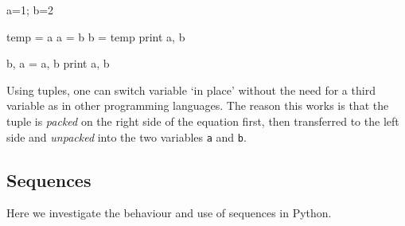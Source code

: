 \documentclass[draft=false]{article}
\newcommand{\answer}[1]{#1}%
\def\pythoni{\lstinline[language=pythontim]}
\begin{document}
\begin{multicols}{2}
\begin{python}
a=1; b=2

temp = a
a = b
b = temp
print a, b

b, a = a, b
print a, b
\end{python}

\answer{Using tuples, one can switch variable `in place' without the need for a third variable as in other programming languages. The reason this works is that the tuple is \emph{packed} on the right side of the equation first, then transferred to the left side and \emph{unpacked} into the two variables \pythoni{a} and \pythoni{b}.}

\end{multicols}

\pagebreak

\subsection{Sequences}

Here we investigate the behaviour and use of sequences in Python.
\end{document}
